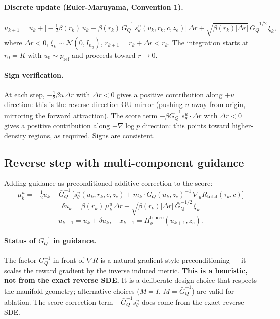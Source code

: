 \documentclass[11pt,a4paper]{article}
\newcommand{\N}{\mathcal{N}}
\newcommand{\Hbpose}{H_\phi^{\text{b-pose}}}
\newcommand{\GQ}{G_Q}
\newcommand{\GQbar}{\bar G_Q}
\begin{document}
\paragraph{Discrete update (Euler-Maruyama, Convention 1).}
\begin{equation}
\boxed{ u_{k+1} = u_k + \bigl[-\tfrac{1}{2}\beta(r_k)\, u_k - \beta(r_k)\, \GQbar^{-1}\, s_\theta^u(u_k, r_k, c, z_e)\bigr]\, \Delta r + \sqrt{\beta(r_k) |\Delta r|}\, \GQbar^{-1/2}\, \xi_k, }
\end{equation}
where $\Delta r < 0$, $\xi_k \sim \N(0, I_{n_q})$, $r_{k+1} = r_k + \Delta r < r_k$. The integration starts at $r_0 = K$ with $u_0 \sim p_\text{ref}$ and proceeds toward $r \to 0$.

\paragraph{Sign verification.} At each step, $-\tfrac{1}{2}\beta u\, \Delta r$ with $\Delta r < 0$ gives a positive contribution along $+u$ direction: this is the reverse-direction OU mirror (pushing $u$ away from origin, mirroring the forward attraction). The score term $-\beta \GQbar^{-1} s_\theta^u \cdot \Delta r$ with $\Delta r < 0$ gives a positive contribution along $+\nabla \log p$ direction: this points toward higher-density regions, as required. Signs are consistent.

\subsection{Reverse step with multi-component guidance}
\label{sec:sampling-step}

Adding guidance as preconditioned additive correction to the score:
\begin{equation}
\mu_k^u = -\tfrac{1}{2} u_k - \GQbar^{-1}\, \bigl[s_\theta^u(u_k, r_k, c, z_e) + m_k \cdot \GQ(u_k, z_e)^{-1}\, \nabla_u R_\text{total}(\tau_k, c)\bigr]
\end{equation}
\begin{equation}
\delta u_k = \beta(r_k)\, \mu_k^u\, \Delta r + \sqrt{\beta(r_k) |\Delta r|}\, \GQbar^{-1/2}\, \xi_k
\end{equation}
\begin{equation}
u_{k+1} = u_k + \delta u_k, \quad x_{k+1} = \Hbpose(u_{k+1}, z_e).
\end{equation}

\paragraph{Status of $\GQ^{-1}$ in guidance.} The factor $\GQ^{-1}$ in front of $\nabla R$ is a natural-gradient-style preconditioning — it scales the reward gradient by the inverse induced metric. \textbf{This is a heuristic, not from the exact reverse SDE.} It is a deliberate design choice that respects the manifold geometry; alternative choices ($M = I$, $M = \GQbar^{-1}$) are valid for ablation. The score correction term $-\GQbar^{-1} s_\theta^u$ does come from the exact reverse SDE.
\end{document}
